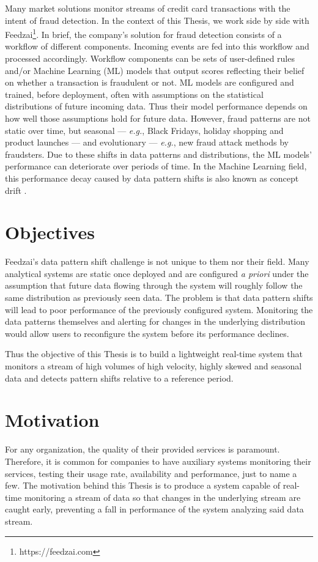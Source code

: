 Many market solutions monitor streams of credit card transactions with the intent of fraud detection. In the context of this Thesis, we work side by side with Feedzai\footnote{https://feedzai.com}. In brief, the company's solution for fraud detection consists of a workflow of different components. Incoming events are fed into this workflow and processed accordingly. Workflow components can be sets of user-defined rules and/or Machine Learning (ML) models that output scores reflecting their belief on whether a transaction is fraudulent or not. ML models are configured and trained,  before deployment, often with assumptions on the statistical distributions of future incoming data. Thus their model performance depends on how well those assumptions hold for future data. However, fraud patterns are not static over time, but seasonal --- \textit{e.g.}, Black Fridays, holiday shopping and product launches --- and evolutionary --- \textit{e.g.}, new fraud attack methods by fraudsters. Due to these shifts in data patterns and distributions, the ML models' performance can deteriorate over periods of time. In the Machine Learning field, this performance decay caused by data pattern shifts is also known as concept drift \cite{drift, gama-drift}.

\section{Objectives} \label{sec:objectives}
Feedzai's data pattern shift challenge is not unique to them nor their field. Many analytical systems are static once deployed and are configured \textit{a priori} under the assumption that future data flowing through the system will roughly follow the same distribution as previously seen data.
The problem is that data pattern shifts will lead to poor performance of the previously configured system. Monitoring the data patterns themselves and alerting for changes in the underlying distribution would allow users to reconfigure the system before its performance declines.

Thus the objective of this Thesis is to build a lightweight real-time system that monitors a stream of high volumes of high velocity, highly skewed and seasonal data and detects pattern shifts relative to a reference period.

\section{Motivation} \label{sec:motivation}
For any organization, the quality of their provided services is paramount. Therefore, it is common for companies to have auxiliary systems monitoring their services, testing their usage rate, availability and performance, just to name a few. The motivation behind this Thesis is to produce a system capable of real-time monitoring a stream of data so that changes in the underlying stream are caught early, preventing a fall in performance of the system analyzing said data stream. 

